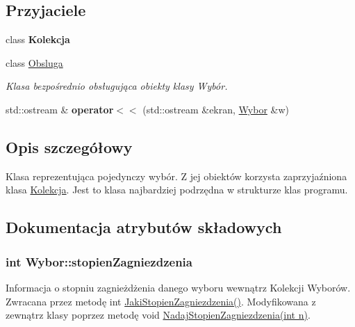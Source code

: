 \subsection*{Przyjaciele}
\begin{DoxyCompactItemize}
\item 
\hypertarget{classWybor_acbfbc86fbec88d567dc6313b7419d6fa}{class {\bfseries Kolekcja}}\label{classWybor_acbfbc86fbec88d567dc6313b7419d6fa}

\item 
\hypertarget{classWybor_aaba4100c363553c323b55344e224e15d}{class \hyperlink{classWybor_aaba4100c363553c323b55344e224e15d}{Obsluga}}\label{classWybor_aaba4100c363553c323b55344e224e15d}

\begin{DoxyCompactList}\small\item\em Klasa bezpośrednio obsługująca obiekty klasy Wybór. \end{DoxyCompactList}\item 
\hypertarget{classWybor_a1181e1d648ce67ab4f131a6f1639c6fd}{std\-::ostream \& {\bfseries operator$<$$<$} (std\-::ostream \&ekran, \hyperlink{classWybor}{Wybor} \&w)}\label{classWybor_a1181e1d648ce67ab4f131a6f1639c6fd}

\end{DoxyCompactItemize}


\subsection{Opis szczegółowy}
Klasa reprezentująca pojedynczy wybór. Z jej obiektów korzysta zaprzyjaźniona klasa \hyperlink{classKolekcja}{Kolekcja}. Jest to klasa najbardziej podrzędna w strukturze klas programu. 

\subsection{Dokumentacja atrybutów składowych}
\hypertarget{classWybor_aee3503d5cc003f8dd73547fe4e58cef9}{
\subsubsection[{stopien\-Zagniezdzenia}]{\setlength{\rightskip}{0pt plus 5cm}int Wybor\-::stopien\-Zagniezdzenia\hspace{0.3cm}{\ttfamily [protected]}}}\label{classWybor_aee3503d5cc003f8dd73547fe4e58cef9}
Informacja o stopniu zagnieżdżenia danego wyboru wewnątrz Kolekcji Wyborów. Zwracana przez metodę int \hyperlink{classWybor_a78db78719c9fc86ad4c3a213397baf54}{Jaki\-Stopien\-Zagniezdzenia()}. Modyfikowana z zewnątrz klasy poprzez metodę void \hyperlink{classWybor_a3257df3c35728ec264a51dce3ac28f55}{Nadaj\-Stopien\-Zagniezdzenia(int n)}. 